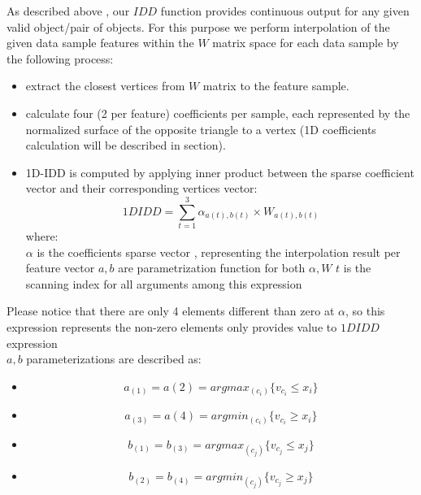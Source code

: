 \begin{}
	As described above , our $IDD$ function provides continuous output for any given valid object/pair of objects. 
	For this purpose we perform interpolation of the given data sample features within the $W$ matrix space for each data sample by the following process:
	\begin{itemize}
		\item extract the closest vertices from $W$ matrix to the feature sample. 
		\item calculate four (2 per feature) coefficients per sample, each represented by the normalized surface of the opposite triangle to a vertex (1D coefficients calculation will be described in section). 
		\item 1D-IDD is computed by applying inner product between the sparse coefficient vector and their corresponding vertices vector:\\
		\begin{equation}
		1DIDD = \sum_{t=1}^{3}\alpha_{a(t),b(t)} \times W_{a(t),b(t)}
		\end{equation}
		where:\\
		$\alpha$ is the coefficients sparse vector , representing the interpolation result per feature vector
		$a , b$ are parametrization function for both $\alpha , W$
		$t$ is the scanning index for all arguments among this expression
	\end{itemize}
		
	Please notice that there are only 4 elements different than zero at $\alpha$, so this expression represents the non-zero elements only provides value to $1DIDD$ expression \\
	
	$a,b$ parameterizations are described as:
	
	\begin{itemize} \label{hypercubes}
		\item	\begin{equation} a_{(1)}=a{(2)} =argmax_{(c_i)} \{ v_{c_i} \leq x_i \} \end{equation}
		\item 	\begin{equation} a_{(3)}=a{(4)} =argmin_{(c_i)} \{ v_{c_i} \geq x_i \}  \end{equation} 
		\item 	\begin{equation} b_{(1)}= b_{(3)} =argmax_{(c_j)} \{ v_{c_j} \leq x_j \}  \end{equation}
		\item 	\begin{equation} b_{(2)}=b_{(4)} =argmin_{(c_j)} \{ v_{c_j} \geq x_j \} \end{equation} 
	\end{itemize}		
	

\end{}
